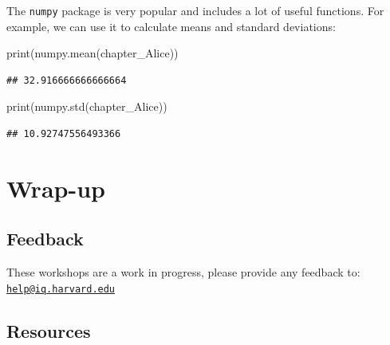 \documentclass[]{book}
\newenvironment{Shaded}{\begin{snugshade}}{\end{snugshade}}
\newcommand{\BuiltInTok}[1]{#1}
\newcommand{\NormalTok}[1]{#1}
\begin{document}
The \texttt{numpy} package is very popular and includes a lot of useful functions. For example, we can use it to calculate means and standard deviations:

\begin{Shaded}
\begin{Highlighting}[]
\BuiltInTok{print}\NormalTok{(numpy.mean(chapter_Alice))}
\end{Highlighting}
\end{Shaded}

\begin{verbatim}
## 32.916666666666664
\end{verbatim}

\begin{Shaded}
\begin{Highlighting}[]
\BuiltInTok{print}\NormalTok{(numpy.std(chapter_Alice))}
\end{Highlighting}
\end{Shaded}

\begin{verbatim}
## 10.92747556493366
\end{verbatim}

\hypertarget{wrap-up-5}{%
\section{Wrap-up}\label{wrap-up-5}}

\hypertarget{feedback-5}{%
\subsection{Feedback}\label{feedback-5}}

These workshops are a work in progress, please provide any feedback to: \href{mailto:help@iq.harvard.edu}{\nolinkurl{help@iq.harvard.edu}}

\hypertarget{resources-7}{%
\subsection{Resources}\label{resources-7}}
\end{document}
